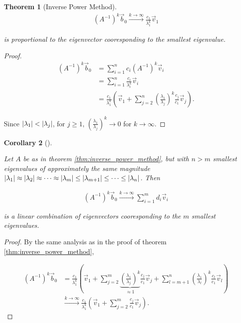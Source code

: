 \documentclass{article}
\theoremstyle{plain} %
\newtheorem{theorem}{Theorem}[section]
\newtheorem{corollary}[theorem]{Corollary}
\theoremstyle{convention} %
\theoremstyle{remark} %
\numberwithin{equation}{section}
\begin{document}
\begin{appendix}
\begin{theorem}[Inverse Power Method]
\begin{align*}
  (A^{-1})^k \vec{b}_0 \xrightarrow{k\rightarrow\infty} \frac{c_1}{\lambda_1^k} \vec{v}_1
\end{align*}

is proportional to the eigenvector cooresponding to the smallest eigenvalue.

\end{theorem}

\begin{proof}

\begin{align*}
  (A^{-1})^k \vec{b}_0 &= \sum_{i=1}^n c_i (A^{-1})^k \vec{v}_i\\
  &= \sum_{i=1}^n \frac{c_i}{\lambda_i^{k}} \vec{v}_i\\
  &= \frac{c_1}{\lambda_1^k} \left( \vec{v}_1 + \sum_{j=2}^n \left(\frac{\lambda_1}{\lambda_j}\right)^k \frac{c_j}{c_1} \vec{v}_j \right).
\end{align*}

Since $\abs{\lambda_1} < \abs{\lambda_j}$, for $j \ge 1$, $\left(\frac{\lambda_1}{\lambda_j}\right)^k \to 0$ for $k \to \infty$.

\end{proof}

\begin{corollary}[]

\label{cor:inverse_power_method}

Let $A$ be as in theorem \ref{thm:inverse_power_method}, but with $n > m$ smallest eigenvalues of approximately the same magnitude $\abs{\lambda_1} \approx \abs{\lambda_2} \approx \dots \approx \abs{\lambda_{m}} \le \abs{\lambda_{m+1}} \leq \dots \leq \abs{\lambda_n}$. Then

\begin{align*}
  (A^{-1})^k \vec{b}_0 \xrightarrow{k\rightarrow\infty} \sum_{i=1}^m d_i \vec{v}_i
\end{align*}

is a linear combination of eigenvectors cooresponding to the $m$ smallest eigenvalues.

\end{corollary}

\begin{proof}

By the same analysis as in the proof of theorem \ref{thm:inverse_power_method},

\begin{align*}
  (A^{-1})^k \vec{b}_0 &= \frac{c_1}{\lambda_1^k} \left( \vec{v}_1 + \sum_{j=2}^m \underbrace{\left(\frac{\lambda_1}{\lambda_j}\right)^k}_{\approx 1} \frac{c_j}{c_1} \vec{v}_j + \sum_{l=m+1}^n \left(\frac{\lambda_1}{\lambda_l}\right)^k \frac{c_l}{c_1} \vec{v}_l \right) \\
  &\xrightarrow{k\rightarrow\infty} \frac{c_1}{\lambda_1^k} \left( \vec{v}_1 + \sum_{j=2}^m \frac{c_j}{c_1} \vec{v}_j \right).
\end{align*}


\end{proof}
\end{appendix}
\end{document}
